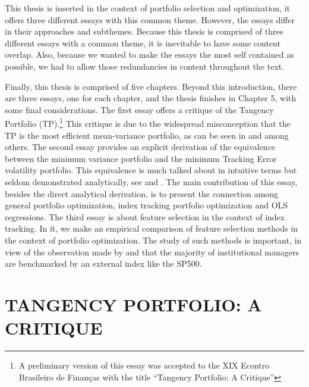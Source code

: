 \documentclass[12pt,oneside,a4paper]{memoir}
\begin{document}
This thesis is inserted in the context of portfolio selection and optimization, it offers three different essays with this common theme.
However, the essays differ in their approaches and subthemes.
Because this thesis is comprised of three different essays with a common theme, it is inevitable to have some content overlap.
Also, because we wanted to make the essays the most self contained as possible, we had to allow those redundancies in content throughout the text.

Finally, this thesis is comprised of five chapters.
Beyond this introduction, there are three essays, one for each chapter, and the thesis finishes in Chapter 5, with some final considerations.
The first essay offers a critique of the Tangency Portfolio (TP).\footnote{A preliminary version of this essay was accepted to the XIX Econtro Brasileiro de Finanças with the title ``Tangency Portfolio: A Critique''}
This critique is due to the widespread misconception that the TP is the most efficient mean-variance portfolio, as can be seen in  and  among others.
The second essay provides an explicit derivation of the equivalence between the minimum variance portfolio and the minimum Tracking Error volatility portfolio.
This equivalence is much talked about in intuitive terms but seldom demonstrated analytically, see  and .
The main contribution of this essay, besides the direct analytical derivation, is to present the connection among general portfolio optimization, index tracking portfolio optimization and OLS regressions.
The third essay is about feature selection in the context of index tracking.
In it, we make an empirical comparison of feature selection methods in the context of portfolio optimization.
The study of such methods is important, in view of the observation made by  and  that the majority of institutional managers are benchmarked by an external index like the SP500.

\chapter{TANGENCY PORTFOLIO: A CRITIQUE}
\linenumbers
\end{document}
